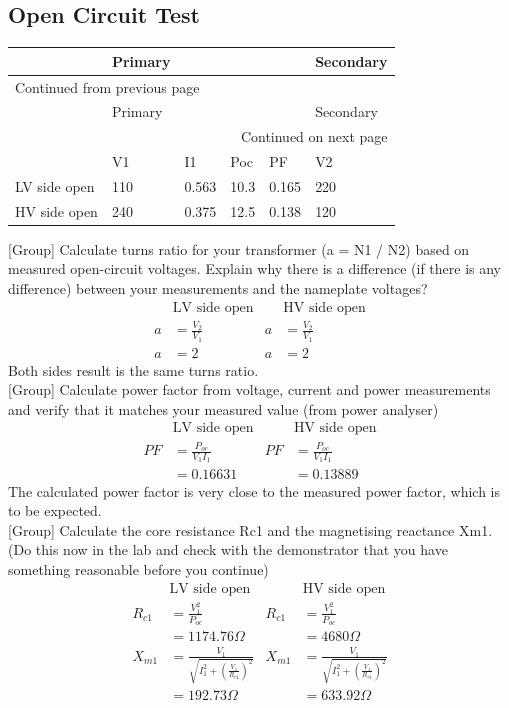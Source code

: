 \documentclass[11pt]{article}
\begin{document}
\subsection{Open Circuit Test}
\label{sec:org8f46b7b}
\begin{longtable}{|l|l|l|l|l|l|}
\hline
 & Primary &  &  &  & Secondary\\
\hline
\endfirsthead
\multicolumn{6}{l}{Continued from previous page} \\
\hline

 & Primary &  &  &  & Secondary \\

\hline
\endhead
\hline\multicolumn{6}{r}{Continued on next page} \\
\endfoot
\endlastfoot
\hline
 & V1 & I1 & Poc & PF & V2\\
\hline
LV side open & 110 & 0.563 & 10.3 & 0.165 & 220\\
\hline
HV side open & 240 & 0.375 & 12.5 & 0.138 & 120\\
\hline
\end{longtable}
{[}Group] Calculate turns ratio for your transformer (a = N1 / N2) based on measured open-circuit voltages. Explain why there is a difference (if there is any difference) between your measurements and the nameplate voltages?
\begin{align*}
&\textrm{LV side open} & &\textrm{HV side open} \\
a&=\frac{V_{2}}{V_{1}} & a&=\frac{V_{2}}{V_{1}} \\
a&=2 & a&=2
\end{align*}
Both sides result is the same turns ratio. \\
{[}Group] Calculate power factor from voltage, current and power measurements and verify that it matches your measured value (from power analyser)
\begin{align*}
&\textrm{LV side open} & &\textrm{HV side open} \\
PF&=\frac{P_{oc}}{V_1I_1} & PF&=\frac{P_{oc}}{V_1I_1} \\
&=0.16631 & &= 0.13889
\end{align*}
The calculated power factor is very close to the measured power factor, which is to be expected. \\
{[}Group] Calculate the core resistance Rc1 and the magnetising reactance Xm1. (Do this now in the lab and check with the demonstrator that you have something reasonable before you continue)
\begin{align*}
&\textrm{LV side open} & &\textrm{HV side open} \\
R_{c1}&=\frac{V_1^2}{P_{oc}} & R_{c1}&=\frac{V_1^2}{P_{oc}} \\
&=1174.76\Omega & &=4680\Omega \\
X_{m1}&=\frac{V_1}{\sqrt{I_1^2+\left(\frac{V_1}{R_{c1}}\right)^2}} & X_{m1}&=\frac{V_1}{\sqrt{I_1^2+\left(\frac{V_1}{R_{c1}}\right)^2}} \\
&=192.73\Omega & &=633.92\Omega
\end{align*}
\end{document}
